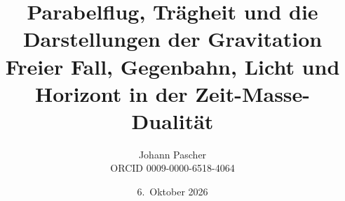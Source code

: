 \documentclass[11pt,a4paper]{report}
\title{Parabelflug, Trägheit und die Darstellungen der Gravitation\\[0.5em]
  \large Freier Fall, Gegenbahn, Licht und Horizont in der Zeit-Masse-Dualität}
\date{6.~Oktober 2026}
\author{Johann Pascher\\\small ORCID 0009-0000-6518-4064}
\begin{document}
\renewcommand{\thechapter}{}
\renewcommand{\thesection}{\arabic{section}}
\maketitle
\tableofcontents

\end{document}
